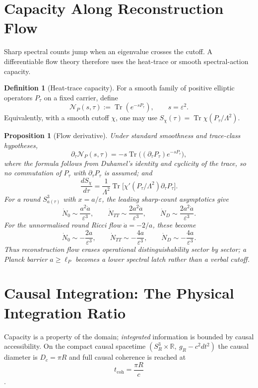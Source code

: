 \documentclass[11pt,a4paper]{article}
\newtheorem{proposition}[theorem]{Proposition}
\theoremstyle{definition}
\newtheorem{definition}[theorem]{Definition}
\theoremstyle{remark}
\newcommand{\Sthree}{S^{3}}
\newcommand{\R}{\mathbb{R}}
\newcommand{\tcoh}{t_{\mathrm{coh}}}
\begin{document}
\section{Capacity Along Reconstruction Flow}
\label{sec:flow-capacity}

Sharp spectral counts jump when an eigenvalue crosses the cutoff.  A differentiable flow theory
therefore uses the heat-trace or smooth spectral-action capacity.

\begin{definition}[Heat-trace capacity]
For a smooth family of positive elliptic operators $P_\tau$ on a fixed carrier, define
\[
\mathcal N_P(s,\tau):=\operatorname{Tr}(e^{-sP_\tau}),
\qquad s=\varepsilon^2.
\]
Equivalently, with a smooth cutoff $\chi$, one may use
$S_\chi(\tau)=\operatorname{Tr}\chi(P_\tau/\Lambda^2)$.
\end{definition}

\begin{proposition}[Flow derivative]
\label{prop:heat-flow}
Under standard smoothness and trace-class hypotheses,
\[
\partial_\tau \mathcal N_P(s,\tau)
=-s\operatorname{Tr}\big((\partial_\tau P_\tau)e^{-sP_\tau}\big),
\]
where the formula follows from Duhamel's identity and cyclicity of the trace, so no commutation
of $P_\tau$ with $\partial_\tau P_\tau$ is assumed; and
\[
\frac{dS_\chi}{d\tau}
=\frac{1}{\Lambda^2}\operatorname{Tr}\big[\chi'(P_\tau/\Lambda^2)\partial_\tau P_\tau\big].
\]
For a round $\Sthree_{a(\tau)}$ with $x=a/\varepsilon$, the leading sharp-count asymptotics give
\[
\dot N_0\sim \frac{a^2\dot a}{\varepsilon^3},\qquad
\dot N_{TT}\sim \frac{2a^2\dot a}{\varepsilon^3},\qquad
\dot N_D\sim \frac{2a^2\dot a}{\varepsilon^3}.
\]
For the unnormalised round Ricci flow $\dot a=-2/a$, these become
\[
\dot N_0\sim -\frac{2a}{\varepsilon^3},\qquad
\dot N_{TT}\sim -\frac{4a}{\varepsilon^3},\qquad
\dot N_D\sim -\frac{4a}{\varepsilon^3}.
\]
Thus reconstruction flow erases operational distinguishability sector by sector; a Planck
barrier $a\ge\ell_P$ becomes a lower spectral latch rather than a verbal cutoff.
\end{proposition}

\section{Causal Integration: The Physical Integration Ratio}
\label{sec:pir}

Capacity is a property of the domain; \emph{integrated} information is bounded by causal
accessibility.  On the compact causal spacetime
$(\Sthree_{R}\times\R,\ g_{R}-c^{2}dt^{2})$ the causal diameter is $D_{c}=\pi R$ and full
causal coherence is reached at
\begin{equation}
\tcoh=\frac{\pi R}{c}
\end{equation}
\cite{PB2026light}.
\end{document}
